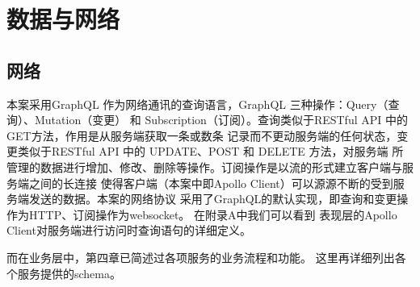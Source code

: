 \section{数据与网络}
\subsection{网络}
本案采用GraphQL 作为网络通讯的查询语言，GraphQL 三种操作：Query（查询）、Mutation（变更）
和 Subscription（订阅）。查询类似于RESTful API 中的GET方法，作用是从服务端获取一条或数条
记录而不更动服务端的任何状态，变更类似于RESTful API 中的 UPDATE、POST 和 DELETE 方法，对服务端
所管理的数据进行增加、修改、删除等操作。订阅操作是以流的形式建立客户端与服务端之间的长连接
使得客户端（本案中即Apollo Client）可以源源不断的受到服务端发送的数据。本案的网络协议
采用了GraphQL的默认实现，即查询和变更操作为HTTP、订阅操作为websocket。 在附录A中我们可以看到
表现层的Apollo Client对服务端进行访问时查询语句的详细定义。

而在业务层中，第四章已简述过各项服务的业务流程和功能。
这里再详细列出各个服务提供的schema。

